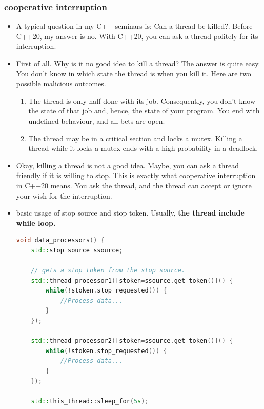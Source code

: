 \documentclass[a4paper,11pt,twoside]{book}
\begin{document}
\subsubsection{cooperative interruption}

\begin{itemize}
	\item A typical question in my C++ seminars is: Can a thread be killed?. Before C++20, my answer is no. With C++20, you can ask a thread politely for its interruption.
	
	\item First of all. Why is it no good idea to kill a thread? The answer is quite easy. You don't know in which state the thread is when you kill it. Here are two possible malicious outcomes.

	\begin{enumerate}
		\item 	The thread is only half-done with its job. Consequently, you don't know the state of that job and, hence, the state of your program. You end with undefined behaviour, and all bets are open.
		
		\item 	The thread may be in a critical section and locks a mutex. Killing a thread while it locks a mutex ends with a high probability in a deadlock.
		
	\end{enumerate}
	
	\item Okay, killing a thread is not a good idea. Maybe, you can ask a thread friendly if it is willing to stop. This is exactly what cooperative interruption in C++20 means. You ask the thread, and the thread can accept or ignore your wish for the interruption.
	
	\item basic usage of stop source and stop token. Usually, \textbf{the thread include while loop. }
\begin{lstlisting}[frame=single, language=c++]	
void data_processors() {
	std::stop_source ssource;
	
	// gets a stop token from the stop source.
	std::thread processor1([stoken=ssource.get_token()]() {
		while(!stoken.stop_requested()) {
			//Process data...
		}     
	});    

	std::thread processor2([stoken=ssource.get_token()]() {
		while(!stoken.stop_requested()) {
			//Process data...
		}     
	});
	
	std::this_thread::sleep_for(5s);
	

\end{lstlisting}
\end{itemize}
\end{document}
